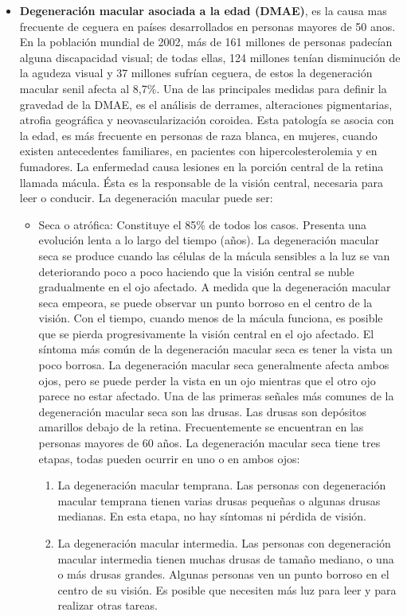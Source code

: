 \begin{itemize}
\item \textbf{Degeneraci\'on macular asociada a la edad (DMAE)}, es la causa mas frecuente de ceguera en pa\'ises desarrollados en personas mayores de 50 anos. En la poblaci\'on mundial de 2002, m\'as de 161 millones de personas padec\'ian alguna discapacidad visual; de todas ellas, 124 millones ten\'ian disminuci\'on de la agudeza visual y 37 millones sufr\'ian ceguera,  de estos la degeneraci\'on macular senil afecta al 8,7\%. Una de las principales medidas para definir la gravedad de la DMAE, es el an\'alisis de derrames, alteraciones pigmentarias, atrofia geogr\'afica  y neovascularizaci\'on coroidea. Esta patolog\'ia se asocia con la edad, es m\'as frecuente en personas de raza blanca, en mujeres, cuando existen antecedentes familiares, en pacientes con hipercolesterolemia y en fumadores. La enfermedad causa lesiones en la porci\'on central de la retina llamada m\'acula. \'Esta es la responsable de la visi\'on central, necesaria para leer o conducir. La degeneraci\'on macular puede ser:
\begin{itemize}
	\item Seca o atr\'ofica: Constituye el 85\% de todos los casos. Presenta una evoluci\'on lenta a lo largo del tiempo (años). La degeneraci\'on macular seca se produce cuando las c\'elulas de la m\'acula sensibles a la luz se van deteriorando poco a poco haciendo que la visi\'on central se nuble gradualmente en el ojo afectado. A medida que la degeneraci\'on macular seca empeora, se puede observar un punto borroso en el centro de la visi\'on. Con el tiempo, cuando menos de la m\'acula funciona, es posible que se pierda progresivamente la visi\'on central en el ojo afectado. El s\'intoma m\'as com\'un de la degeneración macular seca es tener la vista un poco borrosa. La degeneraci\'on macular seca generalmente afecta ambos ojos, pero se puede perder la vista en un ojo mientras que el otro ojo parece no estar afectado. Una de las primeras señales m\'as comunes de la degeneraci\'on macular seca son las drusas. Las drusas son dep\'ositos amarillos debajo de la retina. Frecuentemente se encuentran en las personas mayores de 60 años. La degeneraci\'on macular seca tiene tres etapas, todas pueden ocurrir en uno o en ambos ojos:
\begin{enumerate}
	\item La degeneraci\'on macular temprana. Las personas con degeneraci\'on macular temprana tienen varias drusas pequeñas o algunas drusas medianas. En esta etapa, no hay s\'intomas ni p\'erdida de visi\'on.
\item La degeneraci\'on macular intermedia. Las personas con degeneraci\'on macular intermedia tienen muchas drusas de tamaño mediano, o una o m\'as drusas grandes. Algunas personas ven un punto borroso en el centro de su visi\'on. Es posible que necesiten m\'as luz para leer y para realizar otras tareas.

\end{enumerate}
\end{itemize}
\end{itemize}
